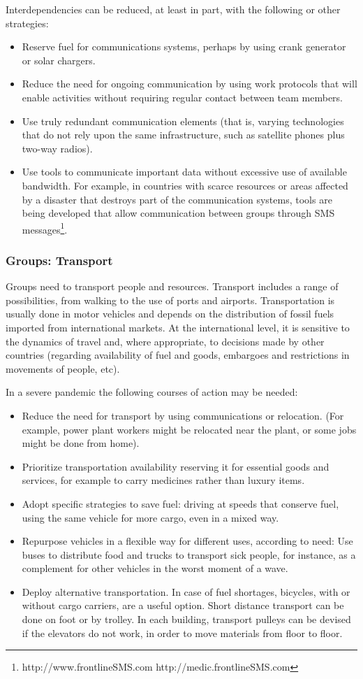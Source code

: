 \documentclass[12pt, a4]{scrartcl}
\begin{document}
Interdependencies can be reduced, at least in part, with the following or other strategies:
\begin{itemize}
	\item Reserve fuel for communications systems, perhaps by using crank generator or solar chargers.
	\item Reduce the need for ongoing communication by using work protocols that will enable activities without requiring regular contact between team members.
	\item Use truly redundant communication elements (that is, varying technologies that do not rely upon the same infrastructure, such as satellite phones plus two-way radios).
	\item Use tools to communicate important data without excessive use of available bandwidth. For example, in countries with scarce resources or areas affected by a disaster that destroys part of the communication systems, tools are being developed that allow communication between groups through SMS messages\footnote{http://www.frontlineSMS.com http://medic.frontlineSMS.com}.
\end{itemize}

\subsubsection{Groups: Transport}
Groups need to transport people and resources. Transport includes a range of possibilities, from walking to the use of ports and airports. Transportation is usually done in motor vehicles and depends on the distribution of fossil fuels imported from international markets. At the international level, it is sensitive to the dynamics of travel and, where appropriate, to decisions made by other countries (regarding availability of fuel and goods, embargoes and restrictions in movements of people, etc).

In a severe pandemic the following courses of action may be needed:
\begin{itemize}
	\item Reduce the need for transport by using communications or relocation. (For example, power plant workers might be relocated near the plant, or some jobs might be done from home).
	\item Prioritize transportation availability reserving it for essential goods and services, for example to carry medicines rather than luxury items.
	\item Adopt specific strategies to save fuel: driving at speeds that conserve fuel, using the same vehicle for more cargo, even in a mixed way.
	\item Repurpose vehicles in a flexible way for different uses, according to need: Use buses to distribute food and trucks to transport sick people, for instance, as a complement for other vehicles in the worst moment of a wave.
	\item Deploy alternative transportation. In case of fuel shortages, bicycles, with or without cargo carriers, are a useful option. Short distance transport can be done on foot or by trolley. In each building, transport pulleys can be devised if the elevators do not work, in order to move materials from floor to floor.
\end{itemize}
\end{document}

